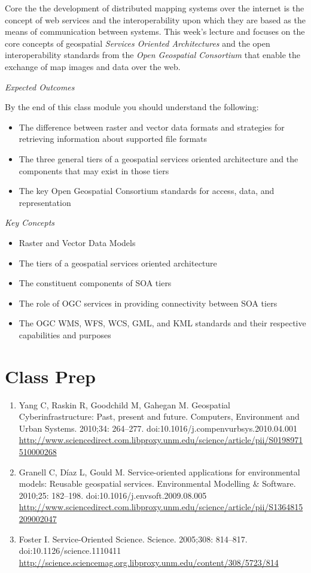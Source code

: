 \documentclass[]{book}
\begin{document}
Core the the development of distributed mapping systems over the
internet is the concept of web services and the interoperability upon
which they are based as the means of communication between systems. This
week's lecture and focuses on the core concepts of geospatial
\emph{Services Oriented Architectures} and the open interoperability
standards from the \emph{Open Geospatial Consortium} that enable the
exchange of map images and data over the web.

\emph{Expected Outcomes}

By the end of this class module you should understand the following:

\begin{itemize}
\item
  The difference between raster and vector data formats and strategies
  for retrieving information about supported file formats
\item
  The three general tiers of a geospatial services oriented architecture
  and the components that may exist in those tiers
\item
  The key Open Geospatial Consortium standards for access, data, and
  representation
\end{itemize}

\emph{Key Concepts}

\begin{itemize}
\item
  Raster and Vector Data Models
\item
  The tiers of a geospatial services oriented architecture
\item
  The constituent components of SOA tiers
\item
  The role of OGC services in providing connectivity between SOA tiers
\item
  The OGC WMS, WFS, WCS, GML, and KML standards and their respective
  capabilities and purposes
\end{itemize}

\section{Class Prep}\label{week05-prep}

\begin{enumerate}
\def\labelenumi{\arabic{enumi}.}
\item
  Yang C, Raskin R, Goodchild M, Gahegan M. Geospatial
  Cyberinfrastructure: Past, present and future. Computers, Environment
  and Urban Systems. 2010;34: 264--277.
  doi:10.1016/j.compenvurbsys.2010.04.001
  \url{http://www.sciencedirect.com.libproxy.unm.edu/science/article/pii/S0198971510000268}
\item
  Granell C, Díaz L, Gould M. Service-oriented applications for
  environmental models: Reusable geospatial services. Environmental
  Modelling \& Software. 2010;25: 182--198.
  doi:10.1016/j.envsoft.2009.08.005
  \url{http://www.sciencedirect.com.libproxy.unm.edu/science/article/pii/S1364815209002047}
\item
  Foster I. Service-Oriented Science. Science. 2005;308: 814--817.
  doi:10.1126/science.1110411
  \url{http://science.sciencemag.org.libproxy.unm.edu/content/308/5723/814}
\end{enumerate}
\end{document}
